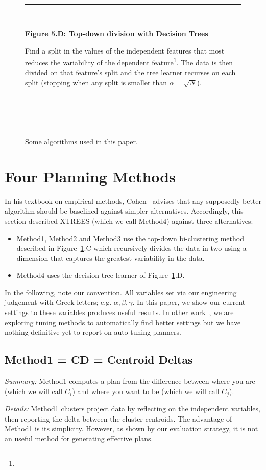 \documentclass{sig-alternate}
\newcommand{\bi}{\begin{itemize}}
\newcommand{\ei}{\end{itemize}}
\newcommand{\fig}[1]{Figure~\ref{fig:#1}}
\begin{document}
\begin{figure}[!t]
\begin{shaded}
	   ~\hrule~
	   
	{\bf Figure 5.D: Top-down division with Decision Trees}
	
	Find a split in the values of the independent features that most reduces the variability
  of the dependent feature\footnote{}. The data is then divided on that feature's split and 
  the tree learner recurses on each split (stopping when any split is smaller than $\alpha=\sqrt{N}$).
	
	 ~\hrule~
	  \end{shaded}
		\caption{Some algorithms used in this paper.}\label{fig:where}
		\end{figure}
 
\section{Four Planning Methods}
In his textbook on empirical methods, Cohen~\cite{cohen95} advises that any supposedly better
algorithm should be baselined against simpler alternatives. Accordingly,
this section described XTREES (which we call Method4) against three  
alternatives: 
  \bi
  \item  
  Method1, Method2 and Method3 use the   top-down
	bi-clustering method described in \fig{where}.C  which recursively divides the
	data in two  using a dimension that captures the greatest variability in the data. 
	\item
 Method4 uses the decision tree learner of \fig{where}.D. 
  \ei
In the following, note our convention. All variables
  set via  our engineering judgement  with Greek letters; e.g. $\alpha,\beta,\gamma$.
  In this paper, we show our current settings to these variables produces useful
  results. In other work~\cite{krall14}, we are exploring tuning methods to automatically
  find better settings but  we have nothing definitive yet to report
  on auto-tuning planners.

\subsection{Method1 = CD =   Centroid Deltas}


 {\em Summary:} Method1  computes a plan from the difference between where you are  (which we will call $C_i$) and
where you want to be  (which we will call $C_j$).
 
 {\em Details:} Method1 clusters project data by reflecting   on the independent variables, then
  reporting the delta between the cluster centroids. The advantage of Method1 is its
  simplicity. However, as shown by our evaluation strategy, it is not an useful
  method for generating effective plans.
  
\end{document}
